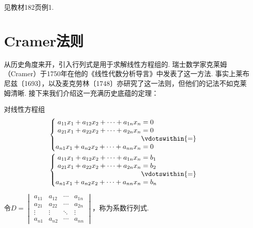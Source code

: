 \begin{solution}
    见教材182页例1.
\end{solution}

\section{Cramer法则}

从历史角度来开，引入行列式是用于求解线性方程组的. 瑞士数学家克莱姆（Cramer）于1750年在他的《线性代数分析导言》中发表了这一方法. 事实上莱布尼兹〔1693〕，以及麦克劳林〔1748〕亦研究了这一法则，但他们的记法不如克莱姆清晰. 接下来我们介绍这一充满历史底蕴的定理：
\begin{theorem} \label{thm:13:Cramer}
    对线性方程组
    \begin{gather}
        \label{eq:13:线性方程组1}
        \begin{cases} \begin{aligned}
                a_{11}x_1+a_{12}x_2+\cdots+a_{1n}x_n & = 0             \\
                a_{21}x_1+a_{22}x_2+\cdots+a_{2n}x_n & = 0             \\
                                                     & \vdotswithin{=} \\
                a_{n1}x_1+a_{n2}x_2+\cdots+a_{nn}x_n & = 0
            \end{aligned} \end{cases}
        \\
        \label{eq:13:线性方程组2}
        \begin{cases} \begin{aligned}
                a_{11}x_1+a_{12}x_2+\cdots+a_{1n}x_n & = b_1           \\
                a_{21}x_1+a_{22}x_2+\cdots+a_{2n}x_n & = b_2           \\
                                                     & \vdotswithin{=} \\
                a_{n1}x_1+a_{n2}x_2+\cdots+a_{nn}x_n & = b_n
            \end{aligned} \end{cases}
    \end{gather}

    令$D=\begin{vmatrix}
            a_{11} & a_{12} & \cdots & a_{1n} \\
            a_{21} & a_{22} & \cdots & a_{2n} \\
            \vdots & \vdots & \ddots & \vdots \\
            a_{n1} & a_{n2} & \cdots & a_{nn}
        \end{vmatrix}$，称为系数行列式.


\end{theorem}
